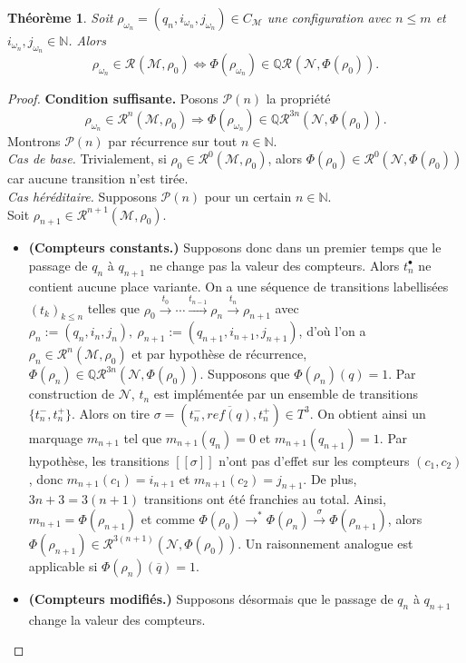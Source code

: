 \documentclass{article}
\newtheorem{theorem}{Théorème}
\theoremstyle{remark}
\theoremstyle{remark}
\newcommand{\postb}[1]{#1^\bullet}
\newcommand{\reach}[3][]{\mathcal{R}^{#1}(\mathcal{#2}, #3)}
\newcommand{\creach}[3][]{\mathbb{Q}\reach[#1]{#2}{#3}}
\newcommand{\reaches}[1][]{\xrightarrow{#1}}
\newcommand{\reachess}{\reaches^*}
\newcommand{\natinduction}[5]{
    Posons $\mathcal{#1}(n)$ la propriété \[#3.\]
    Montrons $\mathcal{#1}(n)$ par récurrence sur tout $n \in #2$.\\
    \textit{Cas de base.} #4\\
    \textit{Cas héréditaire.} Supposons $\mathcal{#1}(n)$ pour un certain $n \in #2$. #5
}
\begin{document}
\begin{theorem}
    \label{theorem:inh-petri-minsky-equivalence}
    Soit $\rho_{\omega_n} = (q_n, i_{\omega_n}, j_{\omega_n}) \in C_{\mathcal{M}}$ une configuration avec $n \leq m$ et $i_{\omega_n}, j_{\omega_n} \in \mathbb{N}$. Alors
    \[\rho_{\omega_n} \in \reach{M}{\rho_0} \Longleftrightarrow \Phi(\rho_{\omega_n}) \in \creach{N}{\Phi(\rho_0)}.\]
\end{theorem}

\begin{proof}
    \textbf{Condition suffisante.} \natinduction{P}{\mathbb{N}}{\rho_{\omega_n} \in \reach[n]{M}{\rho_0} \Longrightarrow \Phi(\rho_{\omega_n}) \in \creach[3n]{N}{\Phi(\rho_0)}}{
        Trivialement, si $\rho_0 \in \reach[0]{M}{\rho_0}$, alors $\Phi(\rho_0) \in \reach[0]{N}{\Phi(\rho_0)}$ car aucune transition n'est tirée.
    }{\\
        Soit $\rho_{n+1} \in \reach[n+1]{M}{\rho_0}$.
        \begin{itemize}
            \item \textbf{(Compteurs constants.)} Supposons donc dans un premier temps que le passage de $q_n$ à $q_{n+1}$ ne change pas la valeur des compteurs.
            Alors $\postb{t_n}$ ne contient aucune place variante.
            On a une séquence de transitions labellisées $(t_k)_{k \leq n}$ telles que $\rho_0 \reaches[t_0] \cdots \reaches[t_{n-1}] \rho_n \reaches[t_n] \rho_{n+1}$ avec $\rho_n := (q_n, i_n, j_n),\ \rho_{n+1} := (q_{n+1}, i_{n+1}, j_{n+1})$, d'où l'on a $\rho_n \in \reach[n]{M}{\rho_0}$ et par hypothèse de récurrence, $\Phi(\rho_n) \in \creach[3n]{N}{\Phi(\rho_0)}$.
            Supposons que $\Phi(\rho_n)(q) = 1$.
            Par construction de $\mathcal{N}$, $t_n$ est implémentée par un ensemble de transitions $\{t_n^-, t_n^+\}$.
            Alors on tire $\sigma = (t_n^-, \overline{ref(q)}, t_n^+) \in T^3$.
            On obtient ainsi un marquage $m_{n+1}$ tel que $m_{n+1}(q_n) = 0$ et $m_{n+1}(q_{n+1}) = 1$.
            Par hypothèse, les transitions $[\![\sigma]\!]$ n'ont pas d'effet sur les compteurs $(c_1, c_2)$, donc $m_{n+1}(c_1) = i_{n+1}$ et $m_{n+1}(c_2) = j_{n+1}$.
            De plus, $3n + 3 = 3(n+1)$ transitions ont été franchies au total.
            Ainsi, $m_{n+1} = \Phi(\rho_{n+1})$ et comme $\Phi(\rho_0) \reachess \Phi(\rho_n) \reaches[\sigma] \Phi(\rho_{n+1})$, alors $\Phi(\rho_{n+1}) \in \reach[3(n+1)]{N}{\Phi(\rho_0)}$.
            Un raisonnement analogue est applicable si $\Phi(\rho_n)(\overline{q}) = 1$.
            \item \textbf{(Compteurs modifiés.)} Supposons désormais que le passage de $q_n$ à $q_{n+1}$ change la valeur des compteurs.

\end{itemize}}
\end{proof}
\end{document}
